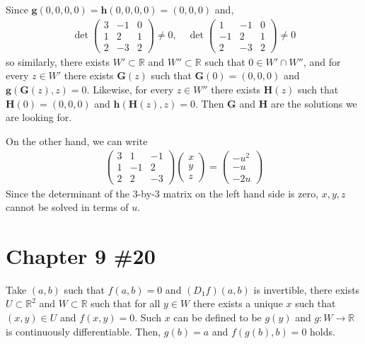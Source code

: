 \documentclass{scrartcl}
\begin{document}
Since \(\mathbf{g}(0, 0, 0, 0) = \mathbf{h}(0, 0, 0, 0) = (0, 0, 0)\) and,
\begin{align*}
  \det \begin{pmatrix}
    3 & -1 & 0 \\
    1 & 2 & 1 \\
    2 & -3 & 2
  \end{pmatrix}
  \not = 0, \quad
  \det \begin{pmatrix}
    1 & -1 & 0 \\
    -1 & 2 & 1 \\
    2 & -3 & 2
  \end{pmatrix}
  \not = 0
\end{align*}
so similarly, there exists \(W' \subset \mathbb{R}\) and \(W'' \subset
\mathbb{R}\) such that \(0 \in W' \cap W''\), and for every \(z \in W'\) there
exists \(\mathbf{G}(z)\) such that \(\mathbf{G}(0) = (0, 0, 0)\) and
\(\mathbf{g}(\mathbf{G}(z), z) = 0\). Likewise, for every \(z \in W''\) there
exists \(\mathbf{H}(z)\) such that \(\mathbf{H}(0) = (0, 0, 0)\) and
\(\mathbf{h}(\mathbf{H}(z), z) = 0\). Then \(\mathbf{G}\) and \(\mathbf{H}\)
are the solutions we are looking for.

On the other hand, we can write
\begin{align*}
  \begin{pmatrix}
    3 & 1 & -1 \\
    1 & -1 & 2 \\
    2 & 2 & -3
  \end{pmatrix}
  \begin{pmatrix}
    x \\
    y \\
    z
  \end{pmatrix}
  = \begin{pmatrix}
    -u^2 \\
    -u \\
    -2u
  \end{pmatrix}
\end{align*}
Since the determinant of the 3-by-3 matrix on the left hand side is zero,
\(x, y, z\) cannot be solved in terms of \(u\).

\section{Chapter 9 \#20}
Take \((a, b)\) such that \(f(a, b) = 0\) and \((D_1 f) (a, b)\) is invertible,
there exists \(U \subset \mathbb{R}^2\) and \(W \subset \mathbb{R}\) such that
for all \(y \in W\) there exists a unique \(x\) such that \((x, y) \in U\) and
\(f(x, y) = 0\). Such \(x\) can be defined to be \(g(y)\) and \(g: W \to
\mathbb{R}\) is continuously differentiable. Then, \(g(b) = a\) and \(f(g(b),
b) = 0\) holds.
\end{document}
